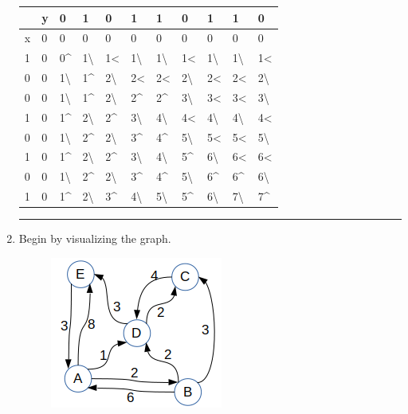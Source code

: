 \documentclass{article}
\begin{document}
\begin{enumerate}
\begin{table}[H]
\begin{tabular}{|l|l|l|l|l|l|l|l|l|l|l|}
\hline
 & y & 0 & 1 & 0 & 1 & 1 & 0 & 1 & 1 & 0 \\ \hline
x & 0 & 0 & 0 & 0 & 0 & 0 & 0 & 0 & 0 & 0 \\ \hline
1 & 0 & 0\textasciicircum{} & 1\textbackslash{} & 1\textless{} & 1\textbackslash{} & 1\textbackslash{} & 1\textless{} & 1\textbackslash{} & 1\textbackslash{} & 1\textless{} \\ \hline
0 & 0 & 1\textbackslash{} & 1\textasciicircum{} & 2\textbackslash{} & 2\textless{} & 2\textless{} & 2\textbackslash{} & 2\textless{} & 2\textless{} & 2\textbackslash{} \\ \hline
0 & 0 & 1\textbackslash{} & 1\textasciicircum{} & 2\textbackslash{} & 2\textasciicircum{} & 2\textasciicircum{} & 3\textbackslash{} & 3\textless{} & 3\textless{} & 3\textbackslash{} \\ \hline
1 & 0 & 1\textasciicircum{} & 2\textbackslash{} & 2\textasciicircum{} & 3\textbackslash{} & 4\textbackslash{} & 4\textless{} & 4\textbackslash{} & 4\textbackslash{} & 4\textless{} \\ \hline
0 & 0 & 1\textbackslash{} & 2\textasciicircum{} & 2\textbackslash{} & 3\textasciicircum{} & 4\textasciicircum{} & 5\textbackslash{} & 5\textless{} & 5\textless{} & 5\textbackslash{} \\ \hline
1 & 0 & 1\textasciicircum{} & 2\textbackslash{} & 2\textasciicircum{} & 3\textbackslash{} & 4\textbackslash{} & 5\textasciicircum{} & 6\textbackslash{} & 6\textless{} & 6\textless{} \\ \hline
0 & 0 & 1\textbackslash{} & 2\textasciicircum{} & 2\textbackslash{} & 3\textasciicircum{} & 4\textasciicircum{} & 5\textbackslash{} & 6\textasciicircum{} & 6\textasciicircum{} & 6\textbackslash{} \\ \hline
1 & 0 & 1\textasciicircum{} & 2\textbackslash{} & 3\textasciicircum{} & 4\textbackslash{} & 5\textbackslash{} & 5\textasciicircum{} & 6\textbackslash{} & 7\textbackslash{} & 7\textasciicircum{} \\ \hline
\end{tabular}
\end{table}


\noindent\rule{8cm}{0.4pt}

\item 
Begin by visualizing the graph. 

\begin{figure}[H]
	\includegraphics[]{P4/graph}
\end{figure}


\end{enumerate}
\end{document}
